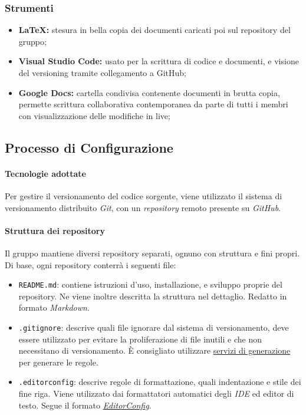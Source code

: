 		\subsubsection{Strumenti}
			\begin{itemize}
				\item \textbf{LaTeX:} stesura in bella copia dei documenti caricati poi sul repository del gruppo;
				\item \textbf{Visual Studio Code:} usato per la scrittura di codice e documenti, e visione del versioning tramite collegamento a GitHub;
				\item \textbf{Google Docs:} cartella condivisa contenente documenti in brutta copia, permette scrittura collaborativa contemporanea da parte di tutti i membri con visualizzazione delle modifiche in live;
			\end{itemize}
		
	\subsection{Processo di Configurazione}
		\paragraph{Tecnologie adottate}
		\aCapo{}  
			Per gestire il versionamento del codice sorgente, viene utilizzato il sistema di versionamento distribuito \emph{Git}, con un \emph{repository} remoto presente su \emph{GitHub}. %

		\paragraph{Struttura dei repository}
		\aCapo{}  
		Il gruppo mantiene diversi repository separati, ognuno con struttura e fini propri.
		Di base, ogni repository conterrà i seguenti file:
		\begin{itemize}
			\item \verb#README.md#: contiene istruzioni d'uso, installazione, e sviluppo proprie del repository. Ne viene inoltre descritta la struttura nel dettaglio. Redatto in formato \textit{Markdown}.
			\item \verb#.gitignore#: descrive quali file ignorare dal sistema di versionamento, deve essere utilizzato per evitare la proliferazione di file inutili e che non necessitano di versionamento. È consigliato utilizzare \href{https://www.toptal.com/developers/gitignore}{servizi di generazione} per generare le regole.
			\item \verb#.editorconfig#: descrive regole di formattazione, quali indentazione e stile dei fine riga. Viene utilizzato dai formattatori automatici degli \textit{IDE} ed editor di testo. Segue il formato \href{https://editorconfig.org/}{\textit{EditorConfig}}.
		\end{itemize}

